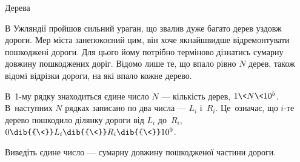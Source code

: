 ﻿\begin{problemAllDefault}{Дерева}

В Ужляндії пройшов сильний ураган, що звалив дуже багато дерев уздовж дороги. Мер міста занепокоєний цим, він хоче якнайшвидше відремонтувати пошкоджені дороги. Для цього йому потрібно терміново дізнатись сумарну довжину пошкоджених доріг. Відомо лише те, що впало рівно $N$ дерев, також відомі відрізки дороги, на які впало кожне дерево.

\InputFile
В~\mbox{1-му} рядку знаходиться єдине число $N$ --- кількість дерев, $1{\<}N{\<}10^5$.
В~наступних $N$ рядках записано по два числа --- $L_i$ і~$R_i$. Це~означає, що \mbox{$i$-те} дерево пошкодило ділянку дороги від $L_i$ до~$R_i$, $0\dib{{\<}}L_i\dib{{\<}}R_i\dib{{\<}}10^9$.

\OutputFile
Виведіть єдине число --- сумарну довжину пошкодженої частини дороги.

\Examples

\begin{example}
%
%
\end{example}

\end{problemAllDefault}

